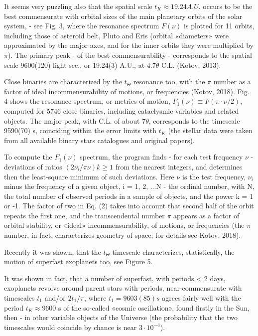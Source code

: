 \documentclass[twoside,draft]{article}
\begin{document}
\begin{sloppypar}
{It seems very puzzling also that the spatial scale $t_{K} \approx 19.24 A.U.$ occurs to be the best
commensurate with orbital sizes of the main planetary orbits of the solar system, - see Fig. 3,
where the resonance spectrum $F( \nu )$ is plotted for 11 orbits, including those of asteroid belt, Pluto
and Eris (orbital «diameters» were approximated by the major axes, and for the inner orbits they
were multiplied by $\pi$). The primary peak - of the best commensurability - corresponds to the
spatial scale 9600(120) light sec., or 19.24(3) A.U., at $4.7 \theta$ C.L. (Kotov, 2013).

Close binaries are characterized by the $t_{\Theta}$ resonance too, with the $\pi$ number as a factor of ideal
incommensurability of motions, or frequencies (Kotov, 2018). Fig. 4 shows the resonance spectrum,
or metrics of motion, $F_{1} (\nu) \equiv F(\pi \cdot \nu/2)$, computed for 5746 close binaries, including cataclysmic
variables and related objects. The major peak, with C.L. of about $7 \theta$, corresponds to the timescale
9590(70) s, coinciding within the error limits with $t_{K}$ (the stellar data were taken from all available
binary stars catalogues and original papers).

To compute the $F_{1} (\nu)$ spectrum, the program finds - for each test frequency $\nu$ - deviations of
ratios $(2\nu_{i} /\pi \nu) k \geq 1$ from the nearest integers, and determines then the least-square minimum of such
deviations. Here $\nu$ is the test frequency, $\nu_{i}$ minus the frequency of a given object, i = 1, 2, ...N - the
ordinal number, with N, the total number of observed periods in a sample of objects, and the power
k = 1 or -1. The factor of two in Eq. (2) takes into account that second half of the orbit repeats the
first one, and the transcendental number $\pi$ appears as a factor of orbital stability, or «ideal»
incommensurability, of motions, or frequencies (the $\pi$ number, in fact, characterizes geometry of
space; for details see Kotov, 2018).

Recently it was shown, that the $t_{\Theta}$ timescale characterizes, statistically, the motion of superfast
exoplanets too, see Figure 5.

It was shown in fact, that a number of superfast, with periods < 2 days, exoplanets revolve
around parent stars with periods, near-commensurate with timescales $t_{1}$ and/or $2 t_{1}/\pi$, where $t_{1} =
9603(85) s$ agrees fairly well with the period $t_{K} \approx 9600$ s of the so-called «cosmic oscillation», found
firstly in the Sun, then - in other variable objects of the Universe (the probability that the two
timescales would coincide by chance is near $3 \cdot 10^{-4}$).

}
\end{sloppypar}
\end{document}

